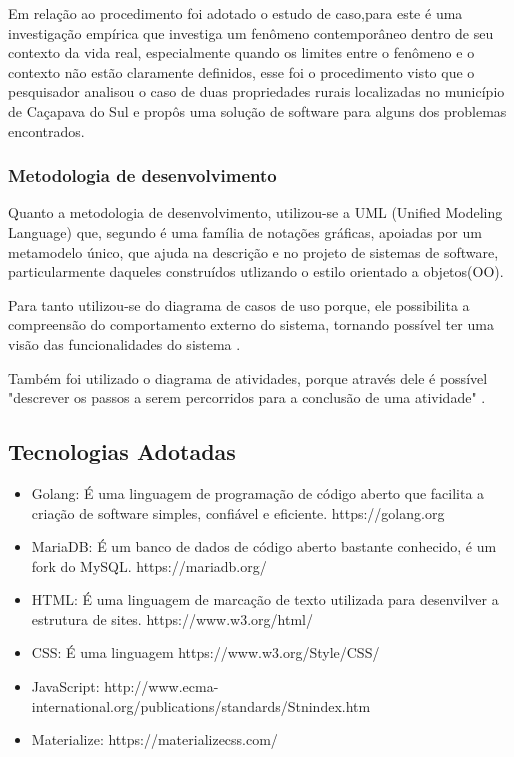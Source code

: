 \documentclass[12pt]{article}
\begin{document}
Em relação ao procedimento foi adotado o estudo de caso,para  este é uma investigação empírica que investiga um fenômeno contemporâneo dentro de seu contexto da vida real, especialmente quando os limites entre o fenômeno e o contexto não estão claramente definidos, esse foi o procedimento visto que o pesquisador analisou o caso de duas propriedades rurais localizadas no município de Caçapava do Sul e propôs uma solução de software para alguns dos problemas encontrados.

\subsubsection{Metodologia de desenvolvimento}

Quanto a metodologia de desenvolvimento, utilizou-se a UML (Unified Modeling Language) que, segundo  é uma família de notações gráficas, apoiadas por um metamodelo único, que ajuda na descrição e no projeto de sistemas de software, particularmente daqueles construídos utlizando o estilo orientado a objetos(OO).

Para tanto utilizou-se do diagrama de casos de uso porque, ele possibilita a compreensão do comportamento externo do sistema, tornando possível ter uma visão das funcionalidades do sistema \cite{guedes18}.

Também foi utilizado o diagrama de atividades, porque através dele é possível "descrever os passos a serem percorridos para a conclusão de uma atividade" \cite{guedes18}.

\subsection{Tecnologias Adotadas}

\begin{itemize}
	\item Golang: É uma linguagem de programação de código aberto que facilita a criação de software simples, confiável e eficiente. https://golang.org	
	\item MariaDB: É um banco de dados de código aberto bastante conhecido, é um fork do MySQL. https://mariadb.org/
	\item HTML: É uma linguagem de marcação de texto utilizada para desenvilver a estrutura de sites. https://www.w3.org/html/
	\item CSS: É uma linguagem  https://www.w3.org/Style/CSS/
	\item JavaScript: http://www.ecma-international.org/publications/standards/Stnindex.htm
	\item Materialize: https://materializecss.com/
\end{itemize}
\end{document}
